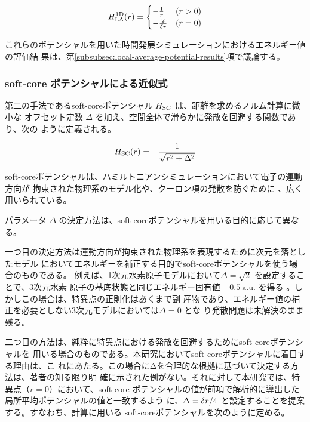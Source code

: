 \documentclass[wabun2025.tex]{subfiles}
\begin{document}
\begin{equation}
H_{\mathrm{LA}}^{\mathrm{1D}}(r) = \begin{cases}
-\frac{1}{r} & (r>0) \\
-\frac{2}{\delta r} & (r=0)
\end{cases}
\label{eq:Hlar1d-fixed}
\end{equation}

これらのポテンシャルを用いた時間発展シミュレーションにおけるエネルギー値の評価結
果は、第\ref{subsubsec:local-average-potential-results}項で議論する。

\subsubsection{soft-core ポテンシャルによる近似式}

第二の手法であるsoft-coreポテンシャル $H_{\mathrm{SC}}$ は、距離を求めるノルム計算に微小な
オフセット定数 $\Delta$ を加え、空間全体で滑らかに発散を回避する関数であり、次の
ように定義される\cite{Kivlichan_2017}。

\begin{equation}
H_{\mathrm{SC}}(r) = -\frac{1}{\sqrt{r^2+\Delta^2}}
\label{eq:Hsc2r}
\end{equation}

soft-coreポテンシャルは、ハミルトニアンシミュレーションにおいて電子の運動方向が
拘束された物理系のモデル化\cite{Hall2009.PhysRevA.80.032507, Fernandez_1991,
LiChen2021.doi:10.1021/acs.jpca.1c00698}や、クーロン項の発散を防ぐために
\cite{Childs2022quantumsimulationof}、広く用いられている。

パラメータ $\Delta$ の決定方法は、soft-coreポテンシャルを用いる目的に応じて異なる。

一つ目の決定方法は運動方向が拘束された物理系を表現するために次元を落としたモデル
においてエネルギーを補正する目的でsoft-coreポテンシャルを使う場合のものである。
例えば、1次元水素原子モデルにおいて$\Delta=\sqrt{2}$ を設定することで、3次元水素
原子の基底状態と同じエネルギー固有値 $-0.5\ \mathrm{a.u.}$ を得る
\cite{Eberly1991.PhysRevA.44.5997}。しかしこの場合は、特異点の正則化はあくまで副
産物であり、エネルギー値の補正を必要としない3次元モデルにおいては$\Delta=0$ とな
り発散問題は未解決のまま残る。

二つ目の方法は、純粋に特異点における発散を回避するためにsoft-coreポテンシャルを
用いる場合のものである。本研究においてsoft-coreポテンシャルに着目する理由は、こ
れにあたる。この場合にΔを合理的な根拠に基づいて決定する方法は、著者の知る限り明
確に示された例がない。それに対して本研究では、特異点（$r=0$）において、soft-core
ポテンシャルの値が前項で解析的に導出した局所平均ポテンシャルの値と一致するよう
に、$\Delta = \delta r/4$ と設定することを提案する。すなわち、計算に用いる
soft-coreポテンシャルを次のように定める。
\end{document}
